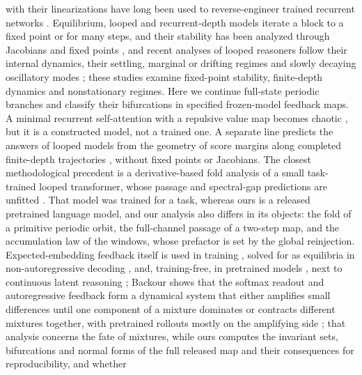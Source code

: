 \documentclass[11pt,letterpaper]{article}
\begin{document}
with their linearizations have long been used to reverse-engineer trained recurrent networks
\cite{sussillo2013opening,maheswaranathan2019reverse}. Equilibrium, looped and recurrent-depth models iterate a block to a fixed point or for
many steps, and their stability has been analyzed through Jacobians and fixed points
\cite{bai2019deq,bai2021stabilizing,geiping2025recurrent,zhu2025ouro,tomihari2025recurrent,yang2026stars,prairie2026parcae,buehlmaier2026layernorm,labovich2026stability,movahedi2026fixedpoint},
and recent analyses of looped reasoners follow their internal dynamics, their settling, marginal or drifting regimes
and slowly decaying oscillatory modes \cite{blayney2026mechanistic,viakhirev2026thinkshallow,park2026loopedearlier};
these studies examine fixed-point stability, finite-depth dynamics and nonstationary regimes. Here we continue
full-state periodic branches and classify their bifurcations in specified frozen-model feedback maps. A minimal recurrent self-attention with a repulsive value map
becomes chaotic \cite{gao2026repulsive}, but it is a constructed model, not a trained one. A separate line predicts the answers of looped models from the geometry of
score margins along completed finite-depth trajectories \cite{luo2026prediction}, without fixed points or Jacobians. The closest methodological precedent is a derivative-based fold analysis of a small task-trained
looped transformer, whose passage and spectral-gap predictions are unfitted \cite{kim2026phase}. That model was
trained for a task, whereas ours is a released pretrained language model, and our analysis also differs in its
objects: the fold of a primitive periodic orbit, the full-channel passage of a two-step map, and the accumulation law
of the windows, whose prefactor is set by the global reinjection. Expected-embedding
feedback itself is used in training \cite{zeng2025ponderlm}, solved for as equilibria in non-autoregressive decoding
\cite{zheng2023deqnar}, and, training-free, in pretrained models
\cite{zhang2025softthinking,wu2025singlethreaded}, next to continuous latent reasoning \cite{hao2024coconut}; Backour shows that the softmax readout and autoregressive feedback form a dynamical system that either amplifies
small differences until one component of a mixture dominates or contracts different mixtures together, with
pretrained rollouts mostly on the amplifying side \cite{backour2026mixture}; that analysis concerns the fate of
mixtures, while ours computes the invariant sets, bifurcations and normal forms of the full released map and
their consequences for reproducibility, and whether
\end{document}
